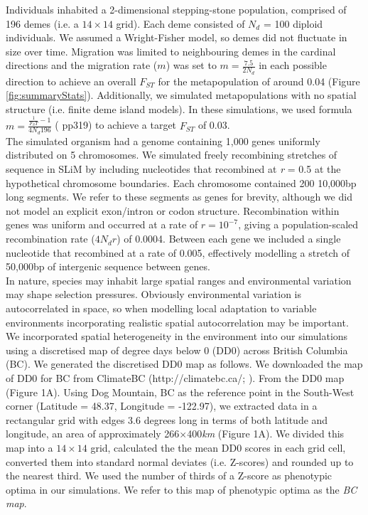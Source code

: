 \documentclass[10pt,twoside,lineno, twocolumn]{GSA_format}
\begin{document}
Individuals inhabited a 2-dimensional stepping-stone population, comprised of 196 demes (i.e. a $14\times14$ grid). Each deme consisted of $N_d$ = 100 diploid individuals. We assumed a Wright-Fisher model, so demes did not fluctuate in size over time. Migration was limited to neighbouring demes in the cardinal directions and the migration rate ($m$) was set to $m = \frac{7.5}{2N_d}$ in each possible direction to achieve an overall $F_{ST}$ for the metapopulation of around 0.04 (Figure \ref{fig:summaryStats}). Additionally, we simulated metapopulations with no spatial structure (i.e. finite deme island models). In these simulations, we used formula $m = \frac{\frac{1}{F_ST} - 1}{4N_d196}$ (\citeauthor{RN173} \citeyear{RN173} pp319) to achieve a target $F_{ST}$ of 0.03.\\

The simulated organism had a genome containing 1,000 genes uniformly distributed on 5 chromosomes. We simulated freely recombining stretches of sequence in SLiM by including nucleotides that recombined at \textit{r} = 0.5 at the hypothetical chromosome boundaries. Each chromosome contained 200 10,000bp long segments. We refer to these segments as genes for brevity, although we did not model an explicit exon/intron or codon structure. Recombination within genes was uniform and occurred at a rate of $r = 10^{-7}$, giving a population-scaled recombination rate ($4N_dr$) of 0.0004. Between each gene we included a single nucleotide that recombined at a rate of 0.005, effectively modelling a stretch of 50,000bp of intergenic sequence between genes. \\

In nature, species may inhabit large spatial ranges and environmental variation may shape selection pressures. Obviously environmental variation is autocorrelated in space, so when modelling local adaptation to variable environments incorporating realistic spatial autocorrelation may be important. \\

 We incorporated spatial heterogeneity in the environment into our simulations using a discretised map of degree days below 0 (DD0) across British Columbia (BC). We generated the discretised DD0 map as follows. We downloaded the map of DD0 for BC from ClimateBC (http://climatebc.ca/; \cite{Wang2016}). From the DD0 map (Figure 1A). Using Dog Mountain, BC as the reference point in the South-West corner (Latitude = 48.37, Longitude = -122.97), we extracted data in a rectangular grid with edges 3.6 degrees long in terms of both latitude and longitude, an area of approximately 266$\times$400\textit{km} (Figure 1A). We divided this map into a $14\times14$ grid, calculated the the mean DD0 scores in each grid cell, converted them into standard normal deviates (i.e. Z-scores) and rounded up to the nearest third. We used the number of thirds of a Z-score as phenotypic optima in our simulations. We refer to this map of phenotypic optima as the \textit{BC map}.\\
\end{document}
